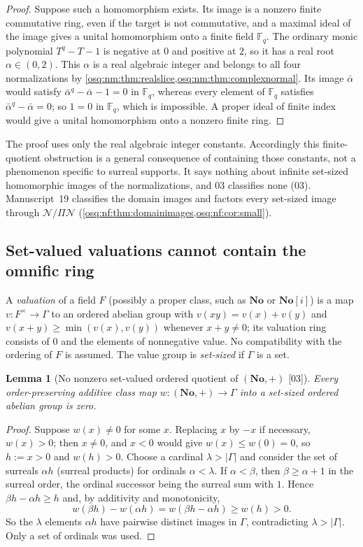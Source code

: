 \documentclass[11pt,letterpaper]{article}
\numberwithin{equation}{section}
\newtheorem{lemma}[lemma]{Lemma}
\theoremstyle{definition}
\theoremstyle{remark}
\theoremstyle{plain}
\newcommand{\No}{\mathbf{No}}
\newcommand{\SC}{\No[i]}
\newcommand{\F}{\mathbb F}
\newcommand{\NN}{\mathcal N}         %
\newcommand{\src}[1]{\textup{\textsf{[#1]}}}
\begin{document}
\begin{proof}
Suppose such a homomorphism exists. Its image is a nonzero finite commutative ring, even
if the target is not commutative, and a maximal ideal of the image gives a unital
homomorphism onto a finite field $\F_q$. The ordinary monic polynomial $T^q-T-1$ is
negative at $0$ and positive at $2$, so it has a real root $\alpha\in(0,2)$. This $\alpha$
is a real algebraic integer and belongs to all four normalizations by
\cref{osq:nm:thm:realslice,osq:nm:thm:complexnormal}. Its image $\bar\alpha$ would satisfy
$\bar\alpha^q-\bar\alpha-1=0$ in $\F_q$, whereas every element of $\F_q$ satisfies
$\bar\alpha^q-\bar\alpha=0$; so $1=0$ in $\F_q$, which is impossible. A proper ideal of
finite index would give a unital homomorphism onto a nonzero finite ring.
\end{proof}

The proof uses only the real algebraic integer constants. Accordingly this finite-quotient
obstruction is a general consequence of containing those constants, not a phenomenon
specific to surreal supports. It says nothing about infinite set-sized homomorphic images
of the normalizations, and 03 classifies none (03). Manuscript~19 classifies the domain
images and factors every set-sized image through $\NN/\Pi\NN$ (\cref{osq:nf:thm:domainimages,osq:nf:cor:small}).

\subsection{Set-valued valuations cannot contain the omnific ring}\label{osq:nm:sub:valuations}

A \emph{valuation} of a field $F$ (possibly a proper class, such as $\No$ or $\SC$) is a
map $v:F^\times\to\Gamma$ to an ordered abelian group with $v(xy)=v(x)+v(y)$ and
$v(x+y)\ge\min(v(x),v(y))$ whenever $x+y\ne0$; its valuation ring consists of $0$ and the
elements of nonnegative value. No compatibility with the ordering of $F$ is assumed. The
value group is \emph{set-sized} if $\Gamma$ is a set.

\begin{lemma}[No nonzero set-valued ordered quotient of $(\No,+)$ \src{03}]\label{osq:nm:lem:orderedmap}
Every order-preserving additive class map $w:(\No,+)\to\Gamma$ into a set-sized ordered
abelian group is zero.
\end{lemma}

\begin{proof}
Suppose $w(x)\ne0$ for some $x$. Replacing $x$ by $-x$ if necessary, $w(x)>0$; then $x\ne0$,
and $x<0$ would give $w(x)\le w(0)=0$, so $h:=x>0$ and $w(h)>0$. Choose a cardinal
$\lambda>|\Gamma|$ and consider the set of surreals $\alpha h$ (surreal products) for
ordinals $\alpha<\lambda$. If $\alpha<\beta$, then $\beta\ge\alpha+1$ in the surreal
order, the ordinal successor being the surreal sum with $1$. Hence
$\beta h-\alpha h\ge h$ and, by additivity and monotonicity,
\[
 w(\beta h)-w(\alpha h)=w(\beta h-\alpha h)\ge w(h)>0 .
\]
So the $\lambda$ elements $\alpha h$ have pairwise distinct images in $\Gamma$, contradicting
$\lambda>|\Gamma|$. Only a set of ordinals was used.
\end{proof}
\end{document}
